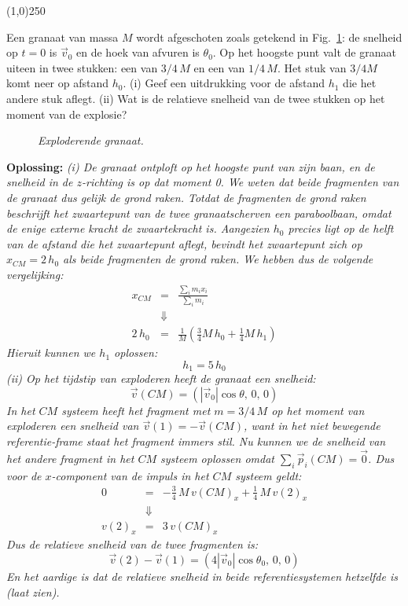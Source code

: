 \begin{center}
\line(1,0){250}
\end{center}
\begin{voorbeeld} \label{ex:cm1}
Een granaat van massa $M$ wordt afgeschoten zoals getekend in Fig.~\ref{fig:cm1}: de 
snelheid op $t=0$ is $\vec{v}_0$ en de hoek van afvuren is $\theta_0$. Op het hoogste punt
valt de granaat uiteen in twee stukken: een van $3/4\,M$ en een van $1/4\,M$. Het stuk van
$3/4M$ komt neer op afstand $h_0$.  (i) Geef een uitdrukking voor de afstand $h_1$ die het andere 
stuk aflegt. (ii) Wat is de relatieve snelheid van de twee stukken op het moment van de explosie?

\begin{figure}[htbp]
\begin{center}
\caption{{\it Exploderende granaat.}}
\label{fig:cm1}
\end{center}
\end{figure} 
{\bf Oplossing: }{\it (i) De granaat ontploft op het hoogste punt van zijn baan, en de snelheid 
in de $z$-richting is op dat moment 0. We weten dat beide fragmenten van de granaat dus
gelijk de grond raken. Totdat de fragmenten de grond raken beschrijft het zwaartepunt van de
twee granaatscherven een paraboolbaan, omdat de enige externe kracht de zwaartekracht is.
Aangezien $h_0$ precies ligt op de helft van de afstand die het zwaartepunt aflegt, bevindt het
zwaartepunt zich op $x_{CM}=2\,h_0$ als beide fragmenten de grond raken. We hebben dus
de volgende vergelijking:
\begin{eqnarray}
x_{CM} &  =  & \frac{\sum_i m_i x_i}{\sum_i m_i} \\
& \Downarrow & \\
2\,h_0 & = & \frac{1}{M}\left(\frac{3}{4}M\,h_0 +\frac{1}{4}M\,h_1\right)
\end{eqnarray}
Hieruit kunnen we $h_1$ oplossen:
\begin{equation}
h_1 = 5\,h_0
\end{equation}
(ii) Op het tijdstip van exploderen heeft de granaat een snelheid:
\begin{equation}
\vec{v}(CM) = (|\vec{v}_0|\cos\theta,\,0,\,0)
\end{equation}
In het $CM$ systeem heeft het fragment met $m=3/4\,M$ op het moment van exploderen een 
snelheid van $\vec{v}(1)=-\vec{v}(CM)$, 
want in het niet bewegende referentie-frame staat het fragment immers stil. Nu kunnen we de snelheid
van het andere fragment in het $CM$ systeem oplossen omdat $\sum_i \vec{p}_i (CM) = \vec{0}$. Dus
voor de $x$-component van de impuls in het $CM$ systeem geldt:
\begin{eqnarray}
0 & = & -\frac{3}{4}\,M\,v(CM)_x+\frac{1}{4}\,M\,v(2)_x \\
&\Downarrow &\\
v(2)_x & = & 3\,v(CM)_x
\end{eqnarray}
Dus de relatieve snelheid van de twee fragmenten is:
\begin{equation}
\vec{v}(2) -\vec{v}(1) = (4|\vec{v}_0|\cos\theta_0,\,0,\,0)
\end{equation}
En het aardige is dat de relatieve snelheid in beide referentiesystemen hetzelfde is (\emph{laat zien}).
}
\end{voorbeeld}

